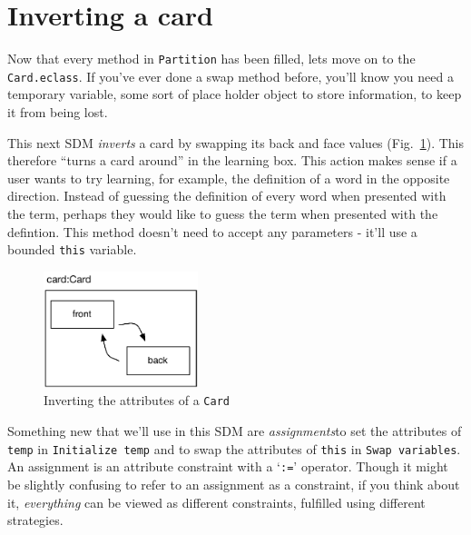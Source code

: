 \newpage
\section{Inverting a card}
\genHeader
\hypertarget{sec:invertCard}{}

Now that every method in \texttt{Partition} has been filled, lets move on to the \texttt{Card.eclass}. If you've ever done a swap method before, you'll know you
need a temporary variable, some sort of place holder object to store information, to keep it from being lost.

This next SDM \emph{inverts} a card by swapping its back and face values (Fig.~\ref{fig:goal_invert}). This therefore ``turns a card around'' in the learning
box. This action makes sense if a user wants to try learning, for example, the definition of a word in the opposite direction. Instead of guessing the
definition of every word when presented with the term, perhaps they would like to guess the term when presented with the defintion. This method doesn't need to
accept any parameters - it'll use a bounded \texttt{this} variable.

\vspace{0.5cm}

\begin{figure}[htbp]
	\centering
    \includegraphics[width=0.4\textwidth]{goal_invert.pdf}
 	\caption{Inverting the attributes of a \texttt{Card}}
 	\label{fig:goal_invert}
\end{figure}
\FloatBarrier

Something new that we'll use in this SDM are \emph{assignments}to set the attributes of \texttt{temp} in \texttt{Initialize temp} and to
swap the attributes of \texttt{this} in \texttt{Swap variables}. An assignment is an attribute constraint with a `\texttt{:=}' operator. Though it might be
slightly confusing to refer to an assignment as a constraint, if you think about it, \emph{everything} can be viewed as different constraints, fulfilled using
different strategies. 

